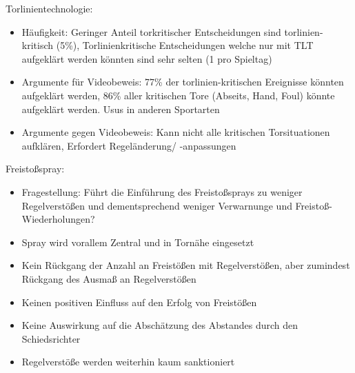 Torlinientechnologie:
\begin{itemize}
    \item Häufigkeit: Geringer Anteil torkritischer Entscheidungen sind torlinien-kritisch (5\%), Torlinienkritische Entscheidungen welche nur mit TLT aufgeklärt werden könnten sind sehr selten (1 pro Spieltag)
    \item Argumente für Videobeweis: 77\% der torlinien-kritischen Ereignisse könnten aufgeklärt werden, 86\% aller kritischen Tore (Abseits, Hand, Foul) könnte aufgeklärt werden. Usus in anderen Sportarten
    \item Argumente gegen Videobeweis: Kann nicht alle kritischen Torsituationen aufklären, Erfordert Regeländerung/ -anpassungen
\end{itemize}

Freistoßspray:
\begin{itemize}
    \item Fragestellung: Führt die Einführung des Freistoßsprays zu weniger Regelverstößen und dementsprechend weniger Verwarnunge und Freistoß-Wiederholungen?
    \item Spray wird vorallem Zentral und in Tornähe eingesetzt
    \item Kein Rückgang der Anzahl an Freistößen mit Regelverstößen, aber zumindest Rückgang des Ausmaß an Regelverstößen
    \item Keinen positiven Einfluss auf den Erfolg von Freistößen
    \item Keine Auswirkung auf die Abschätzung des Abstandes durch den Schiedsrichter
    \item Regelverstöße werden weiterhin kaum sanktioniert
\end{itemize}
